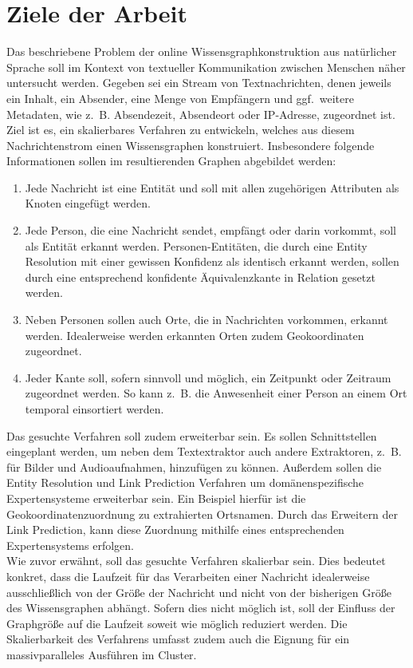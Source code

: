 \documentclass[11pt, a4paper]{scrreprt}
\begin{document}
\section{Ziele der Arbeit}

Das beschriebene Problem der online Wissensgraphkonstruktion aus natürlicher Sprache soll im Kontext von textueller Kommunikation zwischen Menschen näher untersucht werden.
Gegeben sei ein Stream von Textnachrichten, denen jeweils ein Inhalt, ein Absender, eine Menge von Empfängern und ggf.\ weitere Metadaten, wie z.~B. Absendezeit, Absendeort oder IP-Adresse, zugeordnet ist.
Ziel ist es, ein skalierbares Verfahren zu entwickeln, welches aus diesem Nachrichtenstrom einen Wissensgraphen konstruiert.
Insbesondere folgende Informationen sollen im resultierenden Graphen abgebildet werden:
\begin{enumerate}
	\item Jede Nachricht ist eine Entität und soll mit allen zugehörigen Attributen als Knoten eingefügt werden.
	\item Jede Person, die eine Nachricht sendet, empfängt oder darin vorkommt, soll als Entität erkannt werden.
		Personen-Entitäten, die durch eine Entity Resolution mit einer gewissen Konfidenz als identisch erkannt werden, sollen durch eine entsprechend konfidente Äquivalenzkante in Relation gesetzt werden.
	\item Neben Personen sollen auch Orte, die in Nachrichten vorkommen, erkannt werden.
		Idealerweise werden erkannten Orten zudem Geokoordinaten zugeordnet.
	\item Jeder Kante soll, sofern sinnvoll und möglich, ein Zeitpunkt oder Zeitraum zugeordnet werden.
		So kann z.~B. die Anwesenheit einer Person an einem Ort temporal einsortiert werden.
\end{enumerate}

Das gesuchte Verfahren soll zudem erweiterbar sein.
Es sollen Schnittstellen eingeplant werden, um neben dem Textextraktor auch andere Extraktoren, z.~B. für Bilder und Audioaufnahmen, hinzufügen zu können.
Außerdem sollen die Entity Resolution und Link Prediction Verfahren um domänenspezifische Expertensysteme erweiterbar sein.
Ein Beispiel hierfür ist die Geokoordinatenzuordnung zu extrahierten Ortsnamen.
Durch das Erweitern der Link Prediction, kann diese Zuordnung mithilfe eines entsprechenden Expertensystems erfolgen.\\

Wie zuvor erwähnt, soll das gesuchte Verfahren skalierbar sein.
Dies bedeutet konkret, dass die Laufzeit für das Verarbeiten einer Nachricht idealerweise ausschließlich von der Größe der Nachricht und nicht von der bisherigen Größe des Wissensgraphen abhängt.
Sofern dies nicht möglich ist, soll der Einfluss der Graphgröße auf die Laufzeit soweit wie möglich reduziert werden.
Die Skalierbarkeit des Verfahrens umfasst zudem auch die Eignung für ein massivparalleles Ausführen im Cluster.\\
\end{document}
